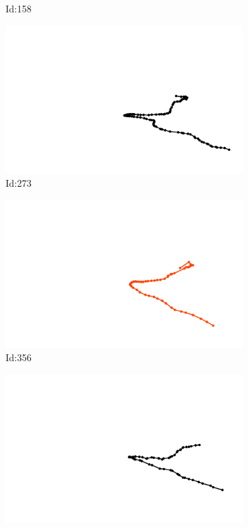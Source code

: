 \documentclass[12pt,twoside]{report}
\begin{document}
\begin{figure}
\begin{subfigure}[b]{0.20\textwidth}
\caption{Id:158}
\end{subfigure}
\begin{subfigure}[b]{0.20\textwidth}
\centering
\includegraphics[width=\textwidth]{../../trajectories/273.png}
\caption{Id:273}
\end{subfigure}
\begin{subfigure}[b]{0.20\textwidth}
\centering
\includegraphics[width=\textwidth]{../../trajectories/356.png}
\caption{Id:356}
\end{subfigure}
\begin{subfigure}[b]{0.20\textwidth}
\centering
\includegraphics[width=\textwidth]{../../trajectories/455.png}

\end{subfigure}
\end{figure}
\end{document}
